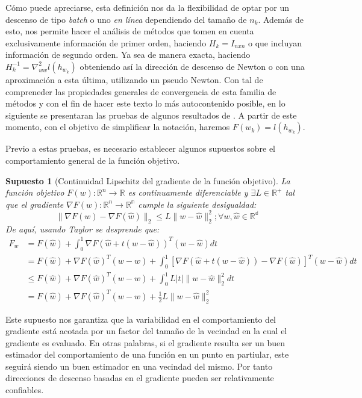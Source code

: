 \documentclass{book}
\theoremstyle{plain}
\newtheorem{assump}{Supuesto}[thm]
\theoremstyle{definition}
\theoremstyle{remark}
\begin{document}
Cómo puede apreciarse, esta definición nos da la flexibilidad de optar por un descenso de tipo \emph{batch} o uno  \emph{en línea} dependiendo del tamaño de $n_k$. Además de esto, nos permite hacer el análisis de métodos que tomen en cuenta exclusivamente información de primer orden, haciendo $H_k = I_{nxn}$ o que incluyan información de segundo orden. Ya sea de manera exacta, haciendo $H^{-1}_k = \nabla^2_{ww}l(h_{w_k})$ obteniendo así la dirección de descenso de Newton o con una aproximación a esta última, utilizando un pseudo Newton. Con tal de compreneder las propiedades generales de convergencia de esta familia de métodos y con el fin de hacer este texto lo más autocontenido posible, en lo siguiente se presentaran las pruebas de algunos resultados de \cite{BOTTOU}. A partir de este momento, con el objetivo de simplificar la notación, haremos $F(w_k) = l(h_{w_k})$.

Previo a estas pruebas, es necesario establecer algunos supuestos sobre el comportamiento general de la función objetivo. 

\begin{assump}[Continuidad Lipschitz del gradiente de la función objetivo]\label{assump:lipschitz}
La función objetivo $F(w):\mathbb{R}^n\rightarrow\mathbb{R}$ es continuamente diferenciable y $\exists L\in\mathbb{R^+}$ tal que el gradiente $\nabla F(w):\mathbb{R}^n\rightarrow\mathbb{R^n}$ cumple la siguiente desigualdad: 
\begin{equation}
    \|\nabla F(w)- \nabla F(\hat{w})\|_2 \leq L\|w-\hat{w}\|_2^2; \forall w, \hat{w} \in \mathbb{R^d}
\end{equation}
De aquí, usando Taylor se desprende que:
\begin{equation*}
    \begin{split}
    F_w & = F(\hat{w}) + \int_0^1\nabla F(\hat{w} + t(w- \hat{w}))^T(w-\hat{w})dt\\
    &= F(\hat{w}) + \nabla F(\hat{w})^T(w- \hat{w}) + \int_0^1[\nabla F(\hat{w} + t(w- \hat{w})) - \nabla F(\hat{w})]^T(w-\hat{w})dt\\
    &\leq F(\hat{w}) + \nabla F(\hat{w})^T(w- \hat{w}) + \int_0^1L|t|\|w - \hat{w}\|_2^2dt\\
    &= F(\hat{w}) + \nabla F(\hat{w})^T(w- \hat{w}) + \frac{1}{2}L\|w - \hat{w}\|_2^2
    \end{split}
\end{equation*}
\end{assump}

Este supuesto nos garantiza que la variabilidad en el comportamiento del gradiente está acotada por un factor del tamaño de la vecindad en la cual el gradiente es evaluado. En otras palabras, si el gradiente resulta ser un buen estimador del comportamiento de una función en un punto en partiular, este seguirá siendo un buen estimador en una vecindad del mismo. Por tanto direcciones de descenso basadas en el gradiente pueden ser relativamente confiables. 
\end{document}
